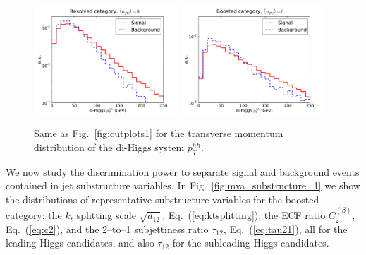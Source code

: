 \begin{figure}[t]
\begin{center}
  \includegraphics[width=0.48\textwidth]{plots/pt_HH_C2_res_noPU.pdf}
  \includegraphics[width=0.48\textwidth]{plots/pt_HH_C2_bst_noPU.pdf}
  \caption{\small Same as Fig.~\ref{fig:cutplots1} for the transverse momentum
    distribution of the di-Higgs system $p_T^{hh}$.
}
\label{fig:pthh}
\end{center}
\end{figure}


We now study the discrimination power to separate signal
and background events contained in
jet substructure
variables.
%
In Fig.~\ref{fig:mva_substructure_1}
we show the distributions of representative
 substructure variables for the boosted category: the
$k_t$ splitting scale $\sqrt{d_{12}}$, Eq.~(\ref{eq:ktsplitting}), 
the ECF ratio $C_2^{(\beta)}$,
Eq.~(\ref{eq:c2}), and
the 2--to--1 subjettiness ratio $\tau_{12}$, Eq.~(\ref{eq:tau21}),
all for the leading
Higgs candidates, and also $\tau_{12}$ for the subleading
Higgs candidates.

